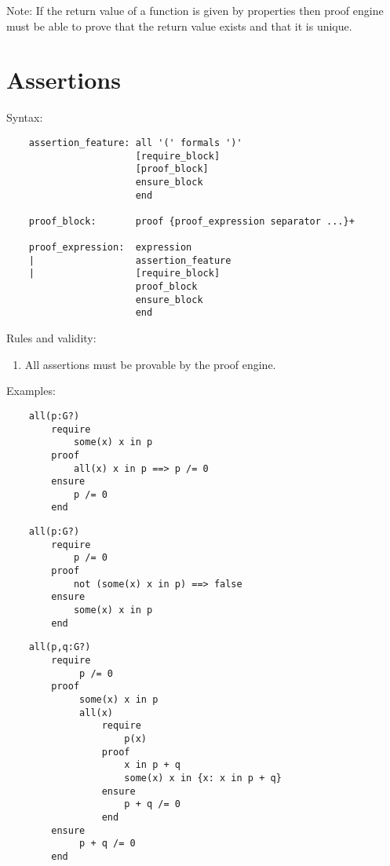 Note: If the return value of a function is given by properties then proof
engine must be able to prove that the return value exists and that it is
unique.



\section{Assertions} \label{assertions}

\noindent Syntax:
\begin{lstlisting}
    assertion_feature: all '(' formals ')'
                       [require_block]
                       [proof_block]
                       ensure_block
                       end

    proof_block:       proof {proof_expression separator ...}+

    proof_expression:  expression
    |                  assertion_feature
    |                  [require_block]
                       proof_block
                       ensure_block
                       end
\end{lstlisting}

\noindent Rules and validity:
\begin{enumerate}
\item All assertions must be provable by the proof engine.
\end{enumerate}

\noindent Examples:

\begin{lstlisting}
    all(p:G?)
        require
            some(x) x in p
        proof
            all(x) x in p ==> p /= 0    
        ensure
            p /= 0
        end  
\end{lstlisting}


\begin{lstlisting}
    all(p:G?)
        require
            p /= 0
        proof
            not (some(x) x in p) ==> false
        ensure
            some(x) x in p
        end
\end{lstlisting}

\begin{lstlisting}
    all(p,q:G?)
        require
             p /= 0
        proof
             some(x) x in p
             all(x)
                 require
                     p(x)
                 proof
                     x in p + q
                     some(x) x in {x: x in p + q}
                 ensure
                     p + q /= 0
                 end
        ensure
             p + q /= 0
        end
\end{lstlisting}




